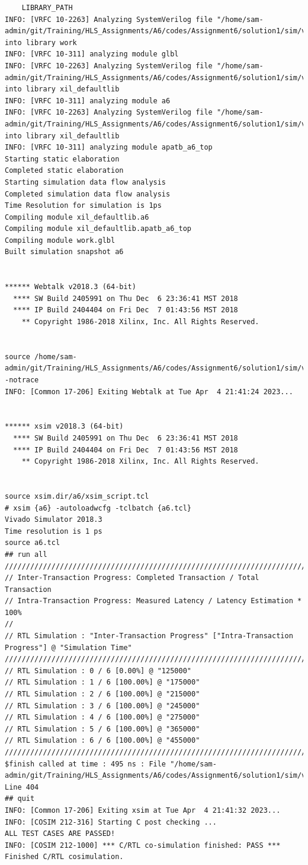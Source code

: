 \documentclass{article}
\begin{document}
\begin{lstlisting}
    LIBRARY_PATH
INFO: [VRFC 10-2263] Analyzing SystemVerilog file "/home/sam-admin/git/Training/HLS_Assignments/A6/codes/Assignment6/solution1/sim/verilog/glbl.v" into library work
INFO: [VRFC 10-311] analyzing module glbl
INFO: [VRFC 10-2263] Analyzing SystemVerilog file "/home/sam-admin/git/Training/HLS_Assignments/A6/codes/Assignment6/solution1/sim/verilog/a6.v" into library xil_defaultlib
INFO: [VRFC 10-311] analyzing module a6
INFO: [VRFC 10-2263] Analyzing SystemVerilog file "/home/sam-admin/git/Training/HLS_Assignments/A6/codes/Assignment6/solution1/sim/verilog/a6.autotb.v" into library xil_defaultlib
INFO: [VRFC 10-311] analyzing module apatb_a6_top
Starting static elaboration
Completed static elaboration
Starting simulation data flow analysis
Completed simulation data flow analysis
Time Resolution for simulation is 1ps
Compiling module xil_defaultlib.a6
Compiling module xil_defaultlib.apatb_a6_top
Compiling module work.glbl
Built simulation snapshot a6


****** Webtalk v2018.3 (64-bit)
  **** SW Build 2405991 on Thu Dec  6 23:36:41 MST 2018
  **** IP Build 2404404 on Fri Dec  7 01:43:56 MST 2018
    ** Copyright 1986-2018 Xilinx, Inc. All Rights Reserved.


source /home/sam-admin/git/Training/HLS_Assignments/A6/codes/Assignment6/solution1/sim/verilog/xsim.dir/a6/webtalk/xsim_webtalk.tcl -notrace
INFO: [Common 17-206] Exiting Webtalk at Tue Apr  4 21:41:24 2023...


****** xsim v2018.3 (64-bit)
  **** SW Build 2405991 on Thu Dec  6 23:36:41 MST 2018
  **** IP Build 2404404 on Fri Dec  7 01:43:56 MST 2018
    ** Copyright 1986-2018 Xilinx, Inc. All Rights Reserved.


source xsim.dir/a6/xsim_script.tcl
# xsim {a6} -autoloadwcfg -tclbatch {a6.tcl}
Vivado Simulator 2018.3
Time resolution is 1 ps
source a6.tcl
## run all
////////////////////////////////////////////////////////////////////////////////////
// Inter-Transaction Progress: Completed Transaction / Total Transaction
// Intra-Transaction Progress: Measured Latency / Latency Estimation * 100%
//
// RTL Simulation : "Inter-Transaction Progress" ["Intra-Transaction Progress"] @ "Simulation Time"
////////////////////////////////////////////////////////////////////////////////////
// RTL Simulation : 0 / 6 [0.00%] @ "125000"
// RTL Simulation : 1 / 6 [100.00%] @ "175000"
// RTL Simulation : 2 / 6 [100.00%] @ "215000"
// RTL Simulation : 3 / 6 [100.00%] @ "245000"
// RTL Simulation : 4 / 6 [100.00%] @ "275000"
// RTL Simulation : 5 / 6 [100.00%] @ "365000"
// RTL Simulation : 6 / 6 [100.00%] @ "455000"
////////////////////////////////////////////////////////////////////////////////////
$finish called at time : 495 ns : File "/home/sam-admin/git/Training/HLS_Assignments/A6/codes/Assignment6/solution1/sim/verilog/a6.autotb.v" Line 404
## quit
INFO: [Common 17-206] Exiting xsim at Tue Apr  4 21:41:32 2023...
INFO: [COSIM 212-316] Starting C post checking ...
ALL TEST CASES ARE PASSED!
INFO: [COSIM 212-1000] *** C/RTL co-simulation finished: PASS ***
Finished C/RTL cosimulation.


\end{lstlisting}
\end{document}
